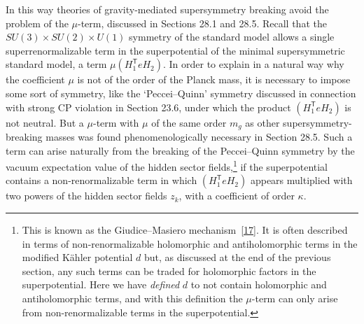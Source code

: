 In this way theories of gravity-mediated supersymmetry breaking avoid the
problem of the \(\mu\)-term, discussed in Sections 28.1 and 28.5. Recall
that the \(SU(3)\times SU(2)\times U(1)\) symmetry of the standard model
allows a single superrenormalizable term in the superpotential of the
minimal supersymmetric standard model, a term \(\mu(H_1^{\mathsf T}eH_2)\).
In order to explain in a natural way why the coefficient \(\mu\) is not of
the order of the Planck mass, it is necessary to impose some sort of
symmetry, like the `Peccei--Quinn' symmetry discussed in connection with
strong CP violation in Section 23.6, under which the product
\((H_1^{\mathsf T}eH_2)\) is not neutral. But a \(\mu\)-term with \(\mu\)
of the same order \(m_g\) as other supersymmetry-breaking masses was found
phenomenologically necessary in Section 28.5. Such a term can arise
naturally from the breaking of the Peccei--Quinn symmetry by the vacuum
expectation value of the hidden sector fields,\footnote{This is known as
the Giudice--Masiero mechanism~\hyperref[ch31-ref-17]{[17]}. It is often
described in terms of non-renormalizable holomorphic and antiholomorphic
terms in the modified Kähler potential \(d\) but, as discussed at the end
of the previous section, any such terms can be traded for holomorphic
factors in the superpotential. Here we have \emph{defined} \(d\) to not
contain holomorphic and antiholomorphic terms, and with this definition the
\(\mu\)-term can only arise from non-renormalizable terms in the
superpotential.} if the superpotential contains a non-renormalizable term
in which \((H_1^{\mathsf T}eH_2)\) appears multiplied with two powers of the
hidden sector fields \(z_k\), with a coefficient of order \(\kappa\).

